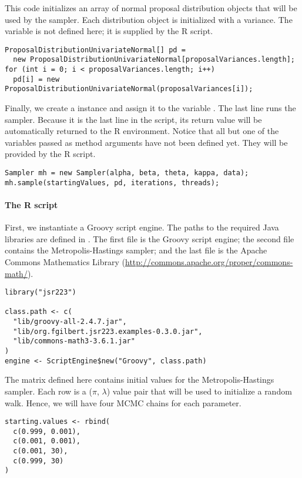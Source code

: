 This code initializes an array of normal proposal distribution objects that will be used by the sampler. Each distribution object is initialized with a variance. The  variable is not defined here; it is supplied by the R script.
\begin{verbatim}
ProposalDistributionUnivariateNormal[] pd =
  new ProposalDistributionUnivariateNormal[proposalVariances.length];
for (int i = 0; i < proposalVariances.length; i++)
  pd[i]	= new ProposalDistributionUnivariateNormal(proposalVariances[i]);
\end{verbatim}

Finally, we create a  instance and assign it to the variable . The last line runs the sampler. Because it is the last line in the script, its return value will be automatically returned to the R environment. Notice that all but one of the variables passed as method arguments have not been defined yet. They will be provided by the R script.
\begin{verbatim}
Sampler mh = new Sampler(alpha, beta, theta, kappa, data);
mh.sample(startingValues, pd, iterations, threads);
\end{verbatim}

\paragraph{The R script} First, we instantiate a Groovy script engine. The paths to the required Java libraries are defined in . The first file is the Groovy script engine; the second file contains the Metropolis-Hastings sampler; and the last file is the Apache Commons Mathematics Library (\url{http://commons.apache.org/proper/commons-math/}).
\begin{verbatim}
library("jsr223")

class.path <- c(
  "lib/groovy-all-2.4.7.jar",
  "lib/org.fgilbert.jsr223.examples-0.3.0.jar",
  "lib/commons-math3-3.6.1.jar"
)
engine <- ScriptEngine$new("Groovy", class.path)
\end{verbatim}

The matrix  defined here contains initial values for the Metropolis-Hastings sampler. Each row is a ($\pi$, $\lambda$) value pair that will be used to initialize a random walk. Hence, we will have four MCMC chains for each parameter.

\begin{verbatim}
starting.values <- rbind(
  c(0.999, 0.001),
  c(0.001, 0.001),
  c(0.001, 30),
  c(0.999, 30)
)
\end{verbatim}

